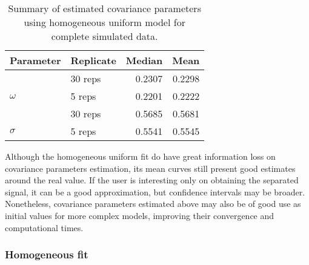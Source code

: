 \begin{table}[b]\centering
\caption{Summary of estimated covariance parameters using homogeneous uniform model for complete simulated data.}
\begin{knitrout}
\color{fgcolor}
\begin{tabular}{llrr}
\toprule
Parameter & Replicate & Median & Mean\\
\midrule
 & 30 reps & 0.2307 & 0.2298\\

\multirow{-2}{*}{\raggedright\arraybackslash $\omega$} & 5 reps & 0.2201 & 0.2222\\
\cmidrule{1-4}
 & 30 reps & 0.5685 & 0.5681\\

\multirow{-2}{*}{\raggedright\arraybackslash $\sigma$} & 5 reps & 0.5541 & 0.5545\\
\bottomrule
\end{tabular}


\end{knitrout}
\label{tab:par-comp2hu}
\end{table}


Although the homogeneous uniform fit do have great information loss on covariance parameters estimation, its mean curves still present good estimates around the real value. If the user is interesting only on obtaining the separated signal, it can be a good approximation, but confidence intervals may be broader. Nonetheless, covariance parameters estimated above may also be of good use as initial values for more complex models, improving their convergence and computational times.  

\subsubsection{Homogeneous fit}
\label{sec:comp2homog}






